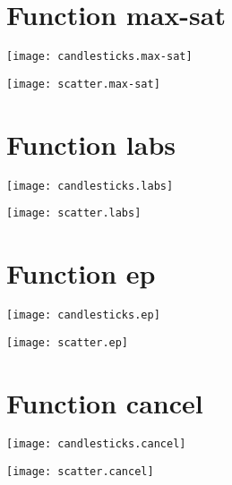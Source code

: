 \section{Function max-sat}
\begin{center}

\end{center}
\begin{center}

\end{center}
\begin{center}
\texttt{[image: candlesticks.max-sat]}
\end{center}
\begin{center}
\texttt{[image: scatter.max-sat]}
\end{center}
\newpage
\section{Function labs}
\begin{center}

\end{center}
\begin{center}

\end{center}
\begin{center}
\texttt{[image: candlesticks.labs]}
\end{center}
\begin{center}
\texttt{[image: scatter.labs]}
\end{center}
\newpage
\section{Function ep}
\begin{center}

\end{center}
\begin{center}

\end{center}
\begin{center}
\texttt{[image: candlesticks.ep]}
\end{center}
\begin{center}
\texttt{[image: scatter.ep]}
\end{center}
\newpage
\section{Function cancel}
\begin{center}

\end{center}
\begin{center}

\end{center}
\begin{center}
\texttt{[image: candlesticks.cancel]}
\end{center}
\begin{center}
\texttt{[image: scatter.cancel]}
\end{center}
\newpage
